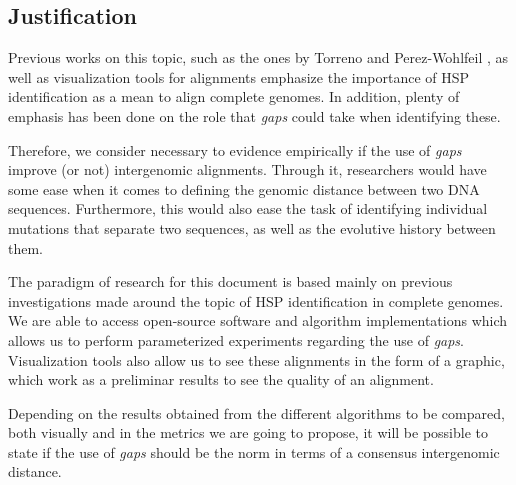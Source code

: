 \subsection{Justification}

Previous works on this topic, such as the ones by Torreno and Perez-Wohlfeil \cite{Tirado2015BreakingTC, PrezWohlfeil2019UltrafastGC}, as well as visualization tools for alignments \cite{Diaz2019MGV} emphasize the importance of HSP identification as a mean to align complete genomes. In addition, plenty of emphasis has been done on the role that \textit{gaps} could take when identifying these.

\medskip

Therefore, we consider necessary to evidence empirically if the use of \textit{gaps} improve (or not) intergenomic alignments. Through it, researchers would have some ease when it comes to defining the genomic distance between two DNA sequences. Furthermore, this would also ease the task of identifying individual mutations that separate two sequences, as well as the evolutive history between them.

\medskip

The paradigm of research for this document is based mainly on previous investigations made around the topic of HSP identification in complete genomes. We are able to access open-source software and algorithm implementations which allows us to perform parameterized experiments regarding the use of \textit{gaps}. Visualization tools also allow us to see these alignments in the form of a graphic, which work as a preliminar results to see the quality of an alignment. 

\medskip

Depending on the results obtained from the different algorithms to be compared, both visually and in the metrics we are going to propose, it will be possible to state if the use of \textit{gaps} should be the norm in terms of a consensus intergenomic distance. 